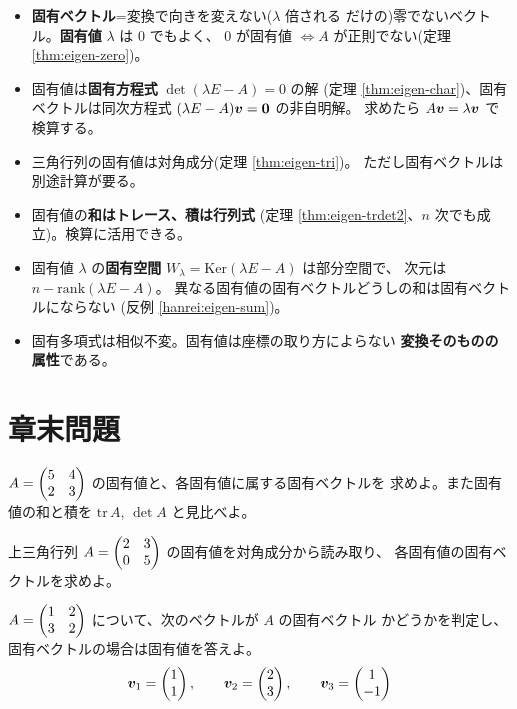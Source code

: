 \begin{matome}
\begin{itemize}
\item \textbf{固有ベクトル}=変換で向きを変えない($\lambda$ 倍される
だけの)零でないベクトル。\textbf{固有値} $\lambda$ は $0$ でもよく、
$0$ が固有値 $\iff A$ が正則でない(定理 \ref{thm:eigen-zero})。
\item 固有値は\textbf{固有方程式} $\det(\lambda E - A) = 0$ の解
(定理 \ref{thm:eigen-char})、固有ベクトルは同次方程式
$(\lambda E - A)\bm{v} = \bm{0}$ の非自明解。
求めたら $A\bm{v} = \lambda\bm{v}$ で検算する。
\item 三角行列の固有値は対角成分(定理 \ref{thm:eigen-tri})。
ただし固有ベクトルは別途計算が要る。
\item 固有値の\textbf{和はトレース、積は行列式}
(定理 \ref{thm:eigen-trdet2}、$n$ 次でも成立)。検算に活用できる。
\item 固有値 $\lambda$ の\textbf{固有空間}
$W_\lambda = \mathrm{Ker}(\lambda E - A)$ は部分空間で、
次元は $n - \mathrm{rank}(\lambda E - A)$。
異なる固有値の固有ベクトルどうしの和は固有ベクトルにならない
(反例 \ref{hanrei:eigen-sum})。
\item 固有多項式は相似不変。固有値は座標の取り方によらない
\textbf{変換そのものの属性}である。
\end{itemize}
\end{matome}

\section*{章末問題}

\begin{mondai}[基本]\label{q:eigen-ex1}
$A = \begin{pmatrix}5 & 4 \\ 2 & 3\end{pmatrix}$ の固有値と、各固有値に属する固有ベクトルを
求めよ。また固有値の和と積を $\mathrm{tr}\,A$, $\det A$ と見比べよ。
\end{mondai}

\begin{mondai}[基本]\label{q:eigen-ex2}
上三角行列 $A = \begin{pmatrix}2 & 3 \\ 0 & 5\end{pmatrix}$ の固有値を対角成分から読み取り、
各固有値の固有ベクトルを求めよ。
\end{mondai}

\begin{mondai}[基本]\label{q:eigen-ex3}
$A = \begin{pmatrix}1 & 2 \\ 3 & 2\end{pmatrix}$ について、次のベクトルが $A$ の固有ベクトル
かどうかを判定し、固有ベクトルの場合は固有値を答えよ。
\[
\bm{v}_1 = \begin{pmatrix}1 \\ 1\end{pmatrix}, \qquad
\bm{v}_2 = \begin{pmatrix}2 \\ 3\end{pmatrix}, \qquad
\bm{v}_3 = \begin{pmatrix}1 \\ -1\end{pmatrix}
\]
\end{mondai}

